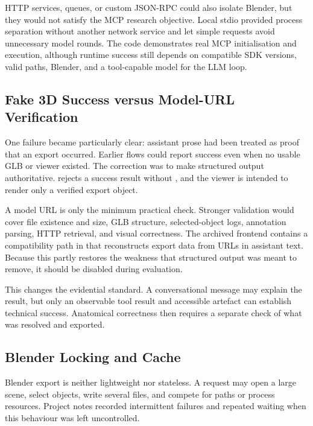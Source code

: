 HTTP services, queues, or custom JSON-RPC could also isolate Blender, but they would not satisfy the MCP research objective. Local stdio provided process separation without another network service and let simple requests avoid unnecessary model rounds. The code demonstrates real MCP initialisation and execution, although runtime success still depends on compatible SDK versions, valid paths, Blender, and a tool-capable model for the LLM loop.

\subsection{Fake 3D Success versus Model-URL Verification}
\label{sec:evolution-artifact-verification}

One failure became particularly clear: assistant prose had been treated as proof that an export occurred. Earlier flows could report success even when no usable GLB or viewer existed. The correction was to make structured output authoritative.  rejects a success result without , and the viewer is intended to render only a verified export object.

A model URL is only the minimum practical check. Stronger validation would cover file existence and size, GLB structure, selected-object logs, annotation parsing, HTTP retrieval, and visual correctness. The archived frontend contains a compatibility path in  that reconstructs export data from URLs in assistant text. Because this partly restores the weakness that structured output was meant to remove, it should be disabled during evaluation.

This changes the evidential standard. A conversational message may explain the result, but only an observable tool result and accessible artefact can establish technical success. Anatomical correctness then requires a separate check of what was resolved and exported.

\subsection{Blender Locking and Cache}
\label{sec:evolution-lock-cache}

Blender export is neither lightweight nor stateless. A request may open a large scene, select objects, write several files, and compete for paths or process resources. Project notes recorded intermittent failures and repeated waiting when this behaviour was left uncontrolled.

